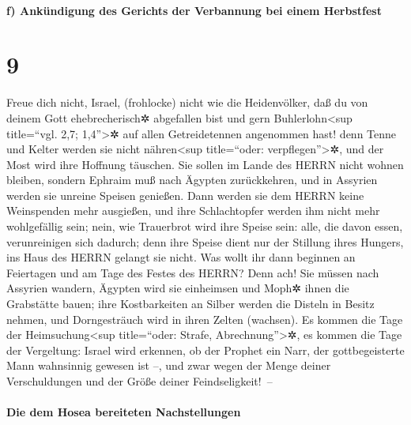 \hypertarget{f-ankuxfcndigung-des-gerichts-der-verbannung-bei-einem-herbstfest}{%
\paragraph{f) Ankündigung des Gerichts der Verbannung bei einem
Herbstfest}\label{f-ankuxfcndigung-des-gerichts-der-verbannung-bei-einem-herbstfest}}

\hypertarget{section-8}{%
\section{9}\label{section-8}}

 Freue dich nicht, Israel, (frohlocke) nicht wie die
Heidenvölker, daß du von deinem Gott ehebrecherisch✲ abgefallen bist und
gern Buhlerlohn\textless sup title=``vgl. 2,7; 1,4''\textgreater✲ auf
allen Getreidetennen angenommen hast!  denn Tenne und
Kelter werden sie nicht nähren\textless sup title=``oder:
verpflegen''\textgreater✲, und der Most wird ihre Hoffnung täuschen.
 Sie sollen im Lande des HERRN nicht wohnen bleiben,
sondern Ephraim muß nach Ägypten zurückkehren, und in Assyrien werden
sie unreine Speisen genießen.  Dann werden sie dem HERRN
keine Weinspenden mehr ausgießen, und ihre Schlachtopfer werden ihm
nicht mehr wohlgefällig sein; nein, wie Trauerbrot wird ihre Speise
sein: alle, die davon essen, verunreinigen sich dadurch; denn ihre
Speise dient nur der Stillung ihres Hungers, ins Haus des HERRN gelangt
sie nicht.  Was wollt ihr dann beginnen an Feiertagen und
am Tage des Festes des HERRN?  Denn ach! Sie müssen nach
Assyrien wandern, Ägypten wird sie einheimsen und Moph✲ ihnen die
Grabstätte bauen; ihre Kostbarkeiten an Silber werden die Disteln in
Besitz nehmen, und Dorngesträuch wird in ihren Zelten (wachsen).
 Es kommen die Tage der Heimsuchung\textless sup
title=``oder: Strafe, Abrechnung''\textgreater✲, es kommen die Tage der
Vergeltung: Israel wird erkennen, ob der Prophet ein Narr, der
gottbegeisterte Mann wahnsinnig gewesen ist --, und zwar wegen der Menge
deiner Verschuldungen und der Größe deiner Feindseligkeit!~--

\hypertarget{die-dem-hosea-bereiteten-nachstellungen}{%
\paragraph{Die dem Hosea bereiteten
Nachstellungen}\label{die-dem-hosea-bereiteten-nachstellungen}}

